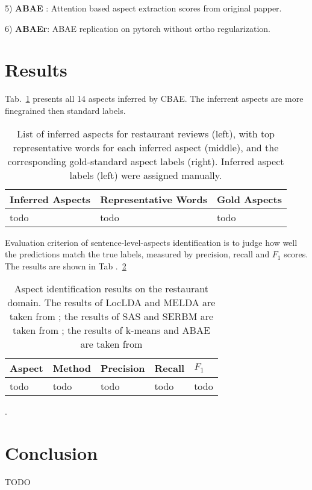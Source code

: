 \documentclass{article}
\begin{document}
5) \textbf{ABAE} \cite{He2018ABAE}: Attention based aspect extraction scores from original papper.

6) \textbf{ABAEr}: ABAE replication on pytorch without ortho regularization.


\section{Results}
Tab.~\ref{tab:aspects} presents all 14 aspects inferred by CBAE. The inferrent aspects are more finegrained then standard labels.

\begin{table}[tbh!]
\begin{center}
\begin{tabular}[t]{l|l|l}
\hline
 Inferred Aspects & Representative Words & Gold Aspects \\
\hline
todo & todo & todo  \\
\hline
\end{tabular}
\caption{List of inferred aspects for restaurant reviews (left), with top representative words for each inferred aspect (middle), and the corresponding gold-standard aspect labels (right). Inferred aspect labels (left) were assigned manually.}
\label{tab:aspects}
\end{center}
\end{table}

Evaluation criterion of sentence-level-aspects identification is to judge how well the predictions match the true labels, measured by precision, recall and $F_1$ scores. The results are shown in Tab .~\ref{tab:eval}

\begin{table}[tbh!]
\begin{center}
\begin{tabular}[t]{l|l|l|l|l}
\hline
 Aspect & Method & Precision & Recall & $F_1$ \\
\hline
todo & todo & todo & todo & todo  \\
\hline
\end{tabular}
\caption{Aspect identification results on the restaurant domain. The results of LocLDA and MELDA are taken from \cite{Zhao2010JMA}; the results of SAS and SERBM are taken from \cite{Wang2015}; the results of k-means and ABAE are taken from \cite{He2018ABAE}}.
\label{tab:eval}
\end{center}
\end{table}


\section{Conclusion}
TODO



\end{document}
